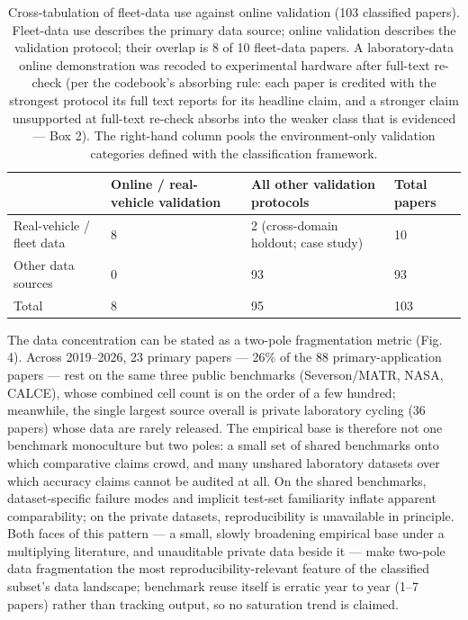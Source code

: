\documentclass[journal]{IEEEtran}
\begin{document}
\begin{table}[!t]
\caption{Cross-tabulation of fleet-data use against online validation (103 classified papers). Fleet-data use describes the primary data source; online validation describes the validation protocol; their overlap is 8 of 10 fleet-data papers. A laboratory-data online demonstration was recoded to experimental hardware after full-text re-check (per the codebook's absorbing rule: each paper is credited with the strongest protocol its full text reports for its headline claim, and a stronger claim unsupported at full-text re-check absorbs into the weaker class that is evidenced --- Box 2). The right-hand column pools the environment-only validation categories defined with the classification framework.}
\label{tab:TABLE_FLEET}
\centering
\footnotesize
\begin{tabular}{|p{1.55in}|p{1.99in}|p{2.24in}|p{0.75in}|}
\hline
\textbf{} & \textbf{Online / real-vehicle validation} & \textbf{All other validation protocols} & \textbf{Total papers} \\
\hline
Real-vehicle / fleet data & 8 & 2 (cross-domain holdout; case study) & 10 \\
Other data sources & 0 & 93 & 93 \\
Total & 8 & 95 & 103 \\
\hline
\hline
\end{tabular}
\end{table}

The data concentration can be stated as a two-pole fragmentation metric (Fig. 4). Across 2019--2026, 23 primary papers --- 26\% of the 88 primary-application papers --- rest on the same three public benchmarks (Severson/MATR, NASA, CALCE), whose combined cell count is on the order of a few hundred; meanwhile, the single largest source overall is private laboratory cycling (36 papers) whose data are rarely released. The empirical base is therefore not one benchmark monoculture but two poles: a small set of shared benchmarks onto which comparative claims crowd, and many unshared laboratory datasets over which accuracy claims cannot be audited at all. On the shared benchmarks, dataset-specific failure modes and implicit test-set familiarity inflate apparent comparability; on the private datasets, reproducibility is unavailable in principle. Both faces of this pattern --- a small, slowly broadening empirical base under a multiplying literature, and unauditable private data beside it --- make two-pole data fragmentation the most reproducibility-relevant feature of the classified subset's data landscape; benchmark reuse itself is erratic year to year (1--7 papers) rather than tracking output, so no saturation trend is claimed.
\end{document}
